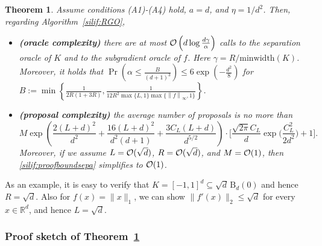 \documentclass[11pt,letterpaper]{article}
\newcommand{\ball}{\mathrm{B}}
\newcommand{\R}{\mathbb{R}}
\newcommand{\norm}[1]{\left\lVert #1 \right\rVert}
\newcommand{\brac}[1]{\left( #1\right)}
\newtheorem{theorem}[thm]{Theorem}
\begin{document}
\begin{theorem}
\label{silif:theo:separation} 
Assume conditions (A1)-(A4) hold, $a=d$, and $\eta =1/d^2$. Then, regarding Algorithm~\ref{silif:RGO}, 
\begin{itemize}
    \item[(a)] \textbf{(oracle complexity)} there are at most ${\cal O}\left(d \log \frac{d \gamma}{\alpha}\right)$ calls to the separation oracle of $K$ and to the subgradient oracle of $f$. Here $\gamma=R/\mbox{minwidth}(K)$. Moreover, it holds that $\Pr\brac{\alpha\leq \frac{B}{(d+1)^3}}\leq 6\exp\brac{-\frac{d^2}{8}} $ for $B:=\min\left\{\frac{1}{2R(1+3R)}, \frac{1}{12R^2 \max\{L,1\} \max\{\norm{f}_\infty,1\} }\right\}$. 
    
  \item[(b)] \textbf{(proposal complexity)} the average number of proposals is no more than 
  \begin{equation}\label{silif:proofboundsepa}
      M\exp\brac{\frac{2(L+d)^2}{d^2}+\frac{16(L+d)^2}{d^2(d+1)} + \frac{3C_L(L+d)}{d^{5/2}}} \cdot\Bigg[\frac{\sqrt{2\pi} C_L}{d}
\exp \Biggl(\frac{C_L^2}{2d^2}\Biggr)+1\Bigg].
  \end{equation}
Moreover, if we assume $L={\cal O}(\sqrt{d})$, $R={\cal O}(\sqrt{d})$, and $M={\cal O}(1)$, then \eqref{silif:proofboundsepa} simplifies to ${\cal O}(1)$.
\end{itemize}
\end{theorem}

As an example, it is easy to verify that
$K=[-1,1]^d \subseteq \sqrt d\,\ball_d(0)$ and hence $R=\sqrt d$. Also for $f(x)=\|x\|_1$, we can show $\|f'(x)\|_2\le \sqrt d$ for every $x\in \R^d$, and hence $L=\sqrt d$.



\subsubsection{Proof sketch of Theorem~\ref{silif:theo:separation}}
\end{document}
